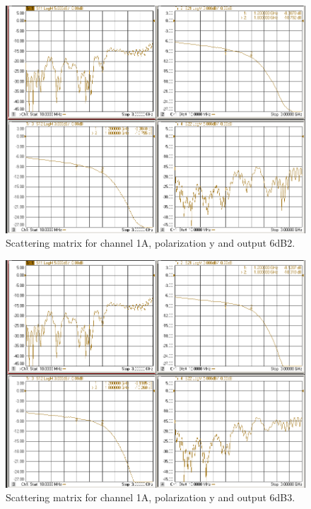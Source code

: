 \documentclass[12pt,a4paper,oneside]{article}
\begin{document}
\begin{figure}[H]
\centering
\includegraphics[width=0.9\linewidth]{VNA_results/1Ay_6dB2.png}
\caption{Scattering matrix for channel 1A, polarization y and output 6dB2.}
\label{fig:1Ay_6dB2}
\end{figure}


\begin{figure}[H]
\centering
\includegraphics[width=0.9\linewidth]{VNA_results/1Ay_6dB3.png}
\caption{Scattering matrix for channel 1A, polarization y and output 6dB3.}
\label{fig:1Ay_6dB3}
\end{figure}
\end{document}
